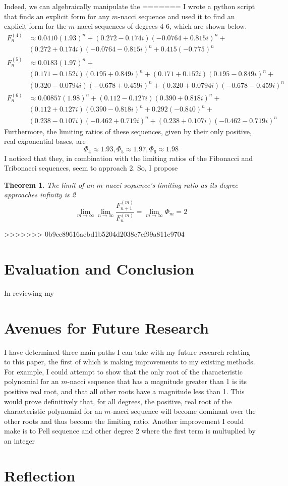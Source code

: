 \documentclass[11pt]{article}
\newtheorem{theorem}{Theorem}[section]
\begin{document}
Indeed, we can algebraically manipulate the 
=======
I wrote a python script that finds an explicit form for any \(m\)-nacci sequence and used it to find an explicit form for the \(m\)-nacci sequences of degrees 4-6, which are shown below. 
\begin{align*}
    F^{(4)}_n & \approx 0.0410(1.93)^n + (0.272-0.174i)(-0.0764+0.815i)^n+ \\ & (0.272+0.174i)(-0.0764-0.815i)^n + 0.415(-0.775)^n \\
    F^{(5)}_n & \approx 0.0183(1.97)^n + \\ & (0.171-0.152i)(0.195+0.849i)^n + (0.171+0.152i)(0.195-0.849i)^n + \\ & (0.320-0.0794i)(-0.678+0.459i)^n + (0.320+0.0794i)(-0.678-0.459i)^n \\
    F^{(6)}_n & \approx 0.00857(1.98)^n + (0.112-0.127i)(0.390 + 0.818i)^n + \\ & (0.112 + 0.127i)(0.390-0.818i)^n + 0.292(-0.840)^n + \\ & (0.238-0.107i)(-0.462 + 0.719i)^n + (0.238 + 0.107i)(-0.462-0.719i)^n
\end{align*}
Furthermore, the limiting ratios of these sequences, given by their only positive, real exponential bases, are 
\[\Phi_4\approx 1.93, \Phi_5\approx 1.97, \Phi_6\approx 1.98\]
I noticed that they, in combination with the limiting ratios of the Fibonacci and Tribonacci sequences, seem to approach 2. So, I propose
\begin{theorem}
    The limit of an \(m\)-nacci sequence's limiting ratio as its degree approaches infinity is 2
    \[\lim_{m\to\infty} \lim_{n\to\infty}\frac{F^{(m)}_{n+1}}{F^{(m)}_{n}}=\lim_{m\to\infty} \Phi_m = 2 \]
\end{theorem}
>>>>>>> 0b9ce89616aebd1b5204d2038c7ef99a811e9704



\section{Evaluation and Conclusion}
In reviewing my 

\section{Avenues for Future Research}
    I have determined three main paths I can take with my future research relating to this paper, the first of which is making improvements to my existing methods. For example, I could attempt to show that the only root of the characteristic polynomial for an \(m\)-nacci sequence that has a magnitude greater than 1 is its positive real root, and that all other roots have a magnitude less than 1. This would prove definitively that, for all degrees, the positive, real root of the characteristic polynomial for an \(m\)-nacci sequence will become dominant over the other roots and thus become the limiting ratio. Another improvement I could make is to 
Pell sequence and other degree 2 where the first term is multuplied by an integer 

\section{Reflection}


\newpage 
\end{document}

